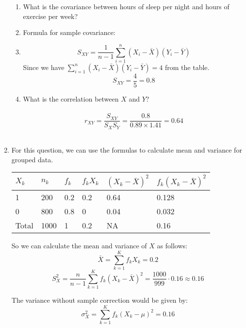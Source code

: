 \documentclass{./../../Latex/handout}
\begin{document}
\begin{enumerate}
\begin{enumerate}
\item What is the covariance between hours of sleep per night and hours of exercise per week? 
\item [] Formula for sample covariance:
\item[] $$ S_{XY} = \frac{1}{n-1}\sum_{i=1}^n (X_i-\bar{X})(Y_i-\bar{Y}) $$
Since we have $\sum_{i=1}^n (X_i-\bar{X})(Y_i-\bar{Y})=4$ from the table. $$ S_{XY} = \frac{4}{5} = 0.8$$
\item What is the correlation between $X$ and $Y$? \\~\\
 $$ r_{XY} = \frac{S_{XY}}{S_X S_Y} = \frac{0.8}{0.89 \times 1.41} = 0.64 $$ \\
\end{enumerate}

\item For this question, we can use the formulas to calculate mean and variance for grouped data.
\begin{center}
\begin{tabularx}{0.9\textwidth}{|@{}Y| @{}Y |@{}Y| @{}Y| @{}Y| @{}Y@{}|}
\hline
 $X_k$ & $n_k$ & $f_k$ & $f_k X_k$ & $(X_k-\bar{X})^2$ & $f_k (X_k-\bar{X})^2$ \\   & 200 & 0.2 & 0.2 & 0.64 & 0.128\\  & 800 & 0.8 & 0 &  0.04 & 0.032 \\ \hline
Total & 1000 & 1 & 0.2 & NA & 0.16 \\ 
\hline
\end{tabularx}	
\end{center}
So we can calculate the mean and variance of $X$ as follows:
$$\bar{X} = \sum_{k=1}^K f_k X_k = 0.2  $$
$$ S_X^2 = \frac{n}{n-1} \sum_{k=1}^K f_k (X_k-\bar{X})^2 = \frac{1000}{999}\cdot 0.16 \approx 0.16 $$ 

The variance without sample correction would be given by:
$$ \sigma_X^2 = \sum_{k=1}^K f_k (X_k-\mu)^2 =  0.16 $$ 

\end{enumerate}
\end{document}
